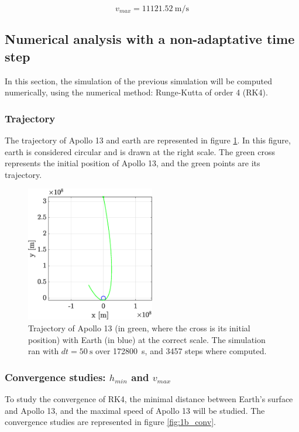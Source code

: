 \documentclass[a4paper,12pt,twoside]{article}
\begin{document}
\begin{equation}
  v_{max} = \SI{11121.52}{\meter\per\second} %
  \label{eq:1a-vitesse-max}
\end{equation}




\subsection{Numerical analysis with a non-adaptative time step}
In this section, the simulation of the previous simulation will be computed numerically, using the numerical method: Runge-Kutta of order 4 (RK4).

\subsubsection{Trajectory}\label{sec:1b_traj}
The trajectory of Apollo 13 and earth are represented in figure \ref{fig:1b_traj}.
In this figure, earth is considered circular and is drawn at the right scale.
The green cross represents the initial position of Apollo 13, and the green points are its trajectory.

\begin{figure}[h]
  \centering
  \includegraphics[width=0.5\textwidth]{graphs/ex1b_traj.eps}
  \caption{Trajectory of Apollo 13 (in green, where the cross is its initial position) with Earth (in blue) at the correct scale. The simulation ran with $dt=\SI{50}{\s}$ over \SI{172800}{\s}, and \num{3457} steps where computed.}
  \label{fig:1b_traj}
\end{figure}


\subsubsection{Convergence studies: $h_{min}$ and $v_{max}$}
To study the convergence of RK4, the minimal distance between Earth's surface and Apollo 13, and the maximal speed of Apollo 13 will be studied.
The convergence studies are represented in figure \ref{fig:1b_conv}.
\end{document}
